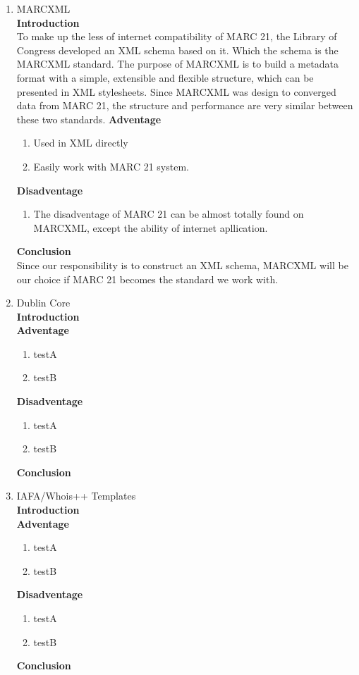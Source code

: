 \begin{enumerate}
	\item MARCXML\\
	{\bf Introduction}\\
	To make up the less of internet compatibility of MARC 21, the Library of Congress developed an XML schema based on it. Which the schema is the MARCXML standard. The purpose of MARCXML is to build a metadata format with a simple, extensible and flexible structure, which can be presented in XML stylesheets. Since MARCXML was design to converged data from MARC 21, the structure and performance are very similar between these two standards.  
	{\bf Adventage}
	\begin{enumerate}
		\item Used in XML directly
		\item Easily work with MARC 21 system.
	\end{enumerate}	
	{\bf Disadventage}
	\begin{enumerate}
		\item The disadventage of MARC 21 can be almost totally found on MARCXML, except the ability of internet apllication.
	\end{enumerate}
	{\bf Conclusion}\\
	Since our responsibility is to construct an XML schema, MARCXML will be our choice if MARC 21 becomes the standard we work with.
	\item Dublin Core\\
	{\bf Introduction}\\
	
	{\bf Adventage}
	\begin{enumerate}
		\item testA
		\item testB
	\end{enumerate}	
	{\bf Disadventage}
	\begin{enumerate}
		\item testA
		\item testB
	\end{enumerate}
	{\bf Conclusion}\\
	
	\item IAFA/Whois++ Templates\\
	{\bf Introduction}\\
	
	{\bf Adventage}
	\begin{enumerate}
		\item testA
		\item testB
	\end{enumerate}	
	{\bf Disadventage}
	\begin{enumerate}
		\item testA
		\item testB
	\end{enumerate}
	{\bf Conclusion}\\	
	
\end{enumerate}

